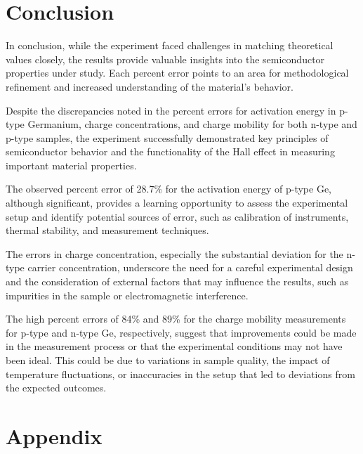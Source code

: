\documentclass[11pt]{article}
\begin{document}
	\clearpage
	
	\section{Conclusion}
	
	In conclusion, while the experiment faced challenges in matching theoretical values closely, the results provide valuable insights into the semiconductor properties under study. Each percent error points to an area for methodological refinement and increased understanding of the material's behavior.
	
	Despite the discrepancies noted in the percent errors for activation energy in p-type Germanium, charge concentrations, and charge mobility for both n-type and p-type samples, the experiment successfully demonstrated key principles of semiconductor behavior and the functionality of the Hall effect in measuring important material properties.
	
	The observed percent error of 28.7\% for the activation energy of p-type Ge, although significant, provides a learning opportunity to assess the experimental setup and identify potential sources of error, such as calibration of instruments, thermal stability, and measurement techniques.
	
	The errors in charge concentration, especially the substantial deviation for the n-type carrier concentration, underscore the need for a careful experimental design and the consideration of external factors that may influence the results, such as impurities in the sample or electromagnetic interference.
	
	The high percent errors of 84\% and 89\% for the charge mobility measurements for p-type and n-type Ge, respectively, suggest that improvements could be made in the measurement process or that the experimental conditions may not have been ideal. This could be due to variations in sample quality, the impact of temperature fluctuations, or inaccuracies in the setup that led to deviations from the expected outcomes.
	
	
	
	\clearpage
	
	\section{Appendix}
	
\end{document}
